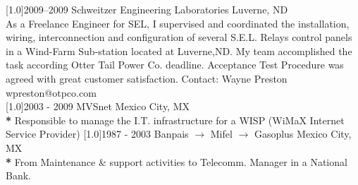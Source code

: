 \documentclass[espanol]{cv-style}     %
\begin{document}
\begin{entrylist}
\entry
  {\scalebox{.8}[1.0]{2009--2009}}
  {Schweitzer Engineering Laboratories}
  {Luverne, ND}
  {\\
As a Freelance Engineer for SEL, I supervised and coordinated the installation, wiring, interconnection and configuration of several S.E.L. Relays control
panels in a Wind-Farm Sub-station located at Luverne,ND. My team accomplished the task according Otter Tail Power Co. deadline. Acceptance Test Procedure was agreed with great customer satisfaction. Contact: Wayne Preston wpreston@otpco.com \\
  }
\entry
  {\scalebox{.8}[1.0]{2003 - 2009}}
  {MVSnet}
  {Mexico City, MX}
  {\\
\textbf{*} Responsible to manage the I.T. infrastructure for a WISP (WiMaX Internet Service Provider)
}
\entry
  {\scalebox{.8}[1.0]{1987 - 2003}}
  {Banpais $\rightarrow$ Mifel $\rightarrow$ Gasoplus}
  {Mexico City, MX}
  {\\
\textbf{*} From Maintenance \& support activities to Telecomm. Manager in a National Bank.
}
\end{entrylist}
\vspace{-0.2cm}
\end{document}
